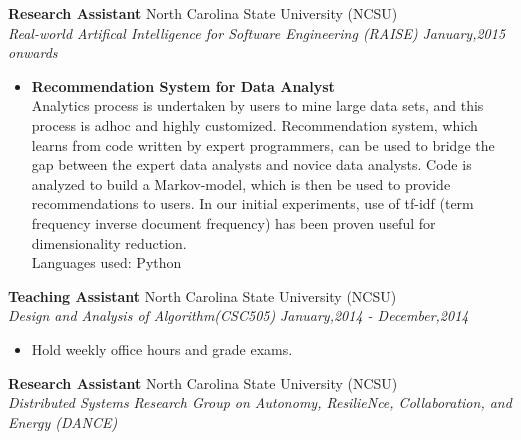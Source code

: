 \documentclass[margin,line]{res}
\begin{document}
\begin{resume}
{\bf Research Assistant} \hfill North Carolina State University (NCSU) \\
\textit{Real-world Artifical Intelligence for Software Engineering (RAISE)} 
\hspace{1cm} \hfill {\it January,2015 onwards}
\begin{itemize}
	\item \textbf{Recommendation System for Data Analyst}\\
	Analytics process is undertaken by users to mine large data sets, and this process is adhoc and highly customized. Recommendation system, which learns from code written by expert
	programmers, can be used to bridge the gap between the expert data analysts and novice data analysts. Code is analyzed to build a Markov-model, which is then be used 
	to provide recommendations to users. In our initial experiments, use of tf-idf (term frequency inverse document frequency) has been proven useful for dimensionality 
	reduction.\\
	Languages used: Python\\
\end{itemize}

{\bf Teaching Assistant} \hfill North Carolina State University (NCSU) \\
\textit{Design and Analysis of Algorithm(CSC505)} \hspace{1cm} \hfill {\it January,2014 - December,2014}
	\begin{itemize}
		\setlength{\itemsep}{-10pt}
		\item Hold weekly office hours and grade exams.
	\end{itemize}

{\bf Research Assistant} \hfill North Carolina State University (NCSU) \\
\textit{Distributed Systems Research Group on Autonomy, ResilieNce, Collaboration, and Energy (DANCE)} 


\end{resume}
\end{document}
